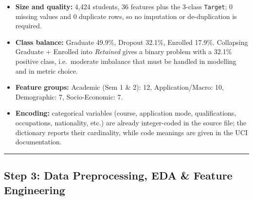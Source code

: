 \documentclass[11pt]{article}
\providecommand{\tightlist}{%
      \setlength{\itemsep}{0pt}\setlength{\parskip}{0pt}}
\begin{document}
\begin{itemize}
\tightlist
\item
  \textbf{Size and quality:} 4,424 students, 36 features plus the
  3-class \texttt{Target}; 0 missing values and 0 duplicate rows, so no
  imputation or de-duplication is required.
\item
  \textbf{Class balance:} Graduate 49.9\%, Dropout 32.1\%, Enrolled
  17.9\%. Collapsing Graduate + Enrolled into \emph{Retained} gives a
  binary problem with a 32.1\% positive class, i.e.~moderate imbalance
  that must be handled in modelling and in metric choice.
\item
  \textbf{Feature groups:} Academic (Sem 1 \& 2): 12, Application/Macro:
  10, Demographic: 7, Socio-Economic: 7.
\item
  \textbf{Encoding:} categorical variables (course, application mode,
  qualifications, occupations, nationality, etc.) are already
  integer-coded in the source file; the dictionary reports their
  cardinality, while code meanings are given in the UCI documentation.
\end{itemize}

    
    \begin{center}\rule{0.5\linewidth}{0.5pt}\end{center}

\hypertarget{step-3-data-preprocessing-eda-feature-engineering}{%
\subsection{Step 3: Data Preprocessing, EDA \& Feature
Engineering}\label{step-3-data-preprocessing-eda-feature-engineering}}
\end{document}
